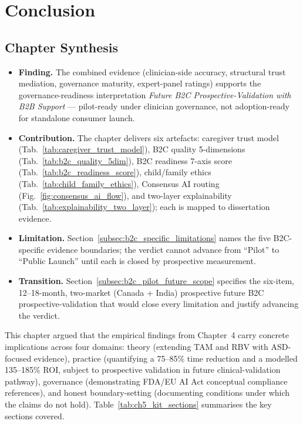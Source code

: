 \section{Conclusion}



\subsection{Chapter Synthesis}
\label{subsec:ch5_synthesis}

\begin{itemize}[leftmargin=*, itemsep=2pt]
    \item \textbf{Finding.} The combined evidence (clinician-side accuracy, structural trust mediation, governance maturity, expert-panel ratings) supports the governance-readiness interpretation \emph{Future B2C Prospective-Validation with B2B Support} --- pilot-ready under clinician governance, not adoption-ready for standalone consumer launch.
    \item \textbf{Contribution.} The chapter delivers six artefacts: caregiver trust model (Tab.~\ref{tab:caregiver_trust_model}), B2C quality 5-dimensions (Tab.~\ref{tab:b2c_quality_5dim}), B2C readiness 7-axis score (Tab.~\ref{tab:b2c_readiness_score}), child/family ethics (Tab.~\ref{tab:child_family_ethics}), Consensus AI routing (Fig.~\ref{fig:consensus_ai_flow}), and two-layer explainability (Tab.~\ref{tab:explainability_two_layer}); each is mapped to dissertation evidence.
    \item \textbf{Limitation.} Section~\ref{subsec:b2c_specific_limitations} names the five B2C-specific evidence boundaries; the verdict cannot advance from ``Pilot'' to ``Public Launch'' until each is closed by prospective measurement.
    \item \textbf{Transition.} Section~\ref{subsec:b2c_pilot_future_scope} specifies the six-item, 12--18-month, two-market (Canada + India) prospective future B2C prospective-validation that would close every limitation and justify advancing the verdict.
\end{itemize}



This chapter argued that the empirical findings from Chapter~4 carry concrete implications across four domains: theory (extending TAM and RBV with ASD-focused evidence), practice (quantifying a 75--85\% time reduction and a modelled 135--185\% ROI, subject to prospective validation in future clinical-validation pathway), governance (demonstrating FDA/EU AI Act conceptual compliance references), and honest boundary-setting (documenting conditions under which the claims do not hold). Table~\ref{tab:ch5_kit_sections} summarises the key sections covered.

